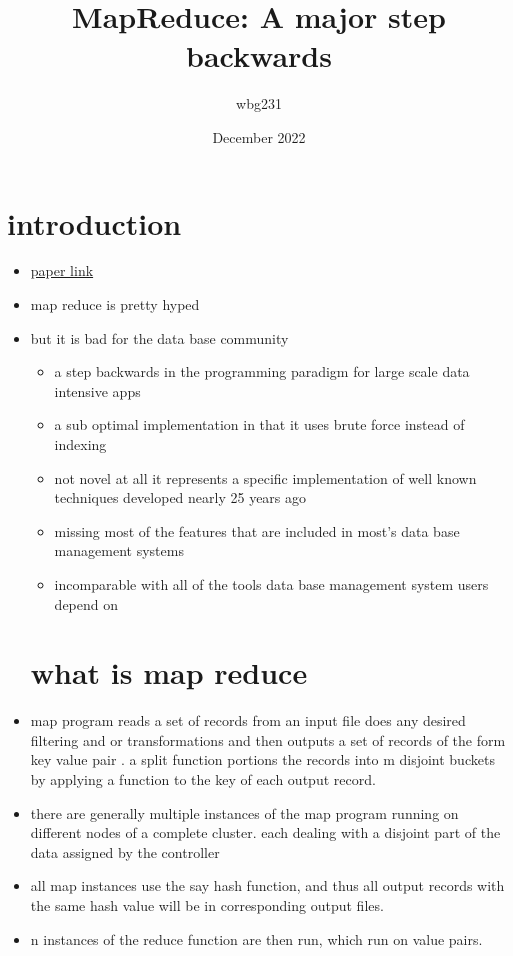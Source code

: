 \documentclass{article}
\title{MapReduce: A major step backwards}
\author{wbg231 }
\date{December 2022}
\begin{document}
\maketitle

\section{introduction}
\begin{itemize}
\item \href{https://brightspace.nyu.edu/content/enforced/261985-SP23_DS-GA_1004_1_001/dewitt_stonebreaker_2008.pdf}{paper link}
\item map reduce is pretty hyped 
\item but it is bad for the data base community
\begin{itemize}
    \item a step backwards in the programming paradigm for large scale data intensive apps
    \item a sub optimal implementation in that it uses brute force instead of indexing 
    \item not novel at all it represents a specific implementation of well known techniques developed nearly 25 years ago
    \item missing most of the features that are included in most's data base management systems 
    \item incomparable with all of the tools data base management system users depend on 
\end{itemize}
\section{what is map reduce}
\item map program reads a set of records from an input file does any desired filtering and or transformations and then outputs a set of records of the form key value pair . a split function portions the records into m disjoint buckets by applying a function to the key of each output record. 
\item there are generally multiple instances of the map program running on different nodes of a complete cluster. each dealing with a disjoint part of the data assigned by the controller
\item all map instances use the say hash function, and thus all output records with the same hash value will be in corresponding output files. 
\item n instances of the reduce function are then run, which run on value pairs. 

\end{itemize}
\end{document}
